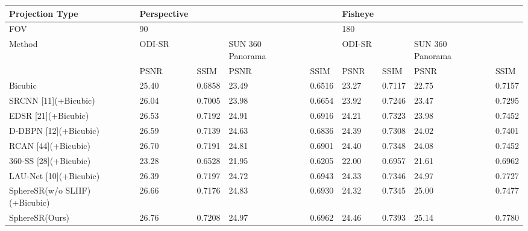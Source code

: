 \begin{tabular}{lllllllll}
\toprule
Projection Type & Perspective &  &  &  & Fisheye &  &  &  \\
\midrule
FOV & 90 &  &  &  & 180 &  &  &  \\
Method & ODI-SR &  & SUN 360 Panorama &  & ODI-SR &  & SUN 360 Panorama &  \\
 & PSNR & SSIM & PSNR & SSIM & PSNR & SSIM & PSNR & SSIM \\
Bicubic & 25.40 & 0.6858 & 23.49 & 0.6516 & 23.27 & 0.7117 & 22.75 & 0.7157 \\
SRCNN [11](+Bicubic) & 26.04 & 0.7005 & 23.98 & 0.6654 & 23.92 & 0.7246 & 23.47 & 0.7295 \\
EDSR [21](+Bicubic) & 26.53 & 0.7192 & 24.91 & 0.6916 & 24.21 & 0.7323 & 23.98 & 0.7452 \\
D-DBPN [12](+Bicubic) & 26.59 & 0.7139 & 24.63 & 0.6836 & 24.39 & 0.7308 & 24.02 & 0.7401 \\
RCAN [44](+Bicubic) & 26.70 & 0.7191 & 24.81 & 0.6901 & 24.40 & 0.7348 & 24.08 & 0.7452 \\
360-SS [28](+Bicubic) & 23.28 & 0.6528 & 21.95 & 0.6205 & 22.00 & 0.6957 & 21.61 & 0.6962 \\
LAU-Net [10](+Bicubic) & 26.39 & 0.7197 & 24.72 & 0.6943 & 24.33 & 0.7346 & 24.97 & 0.7727 \\
SphereSR(w/o SLIIF)(+Bicubic) & 26.66 & 0.7176 & 24.83 & 0.6930 & 24.32 & 0.7345 & 25.00 & 0.7477 \\
SphereSR(Ours) & 26.76 & 0.7208 & 24.97 & 0.6962 & 24.46 & 0.7393 & 25.14 & 0.7780 \\
\bottomrule
\end{tabular}
